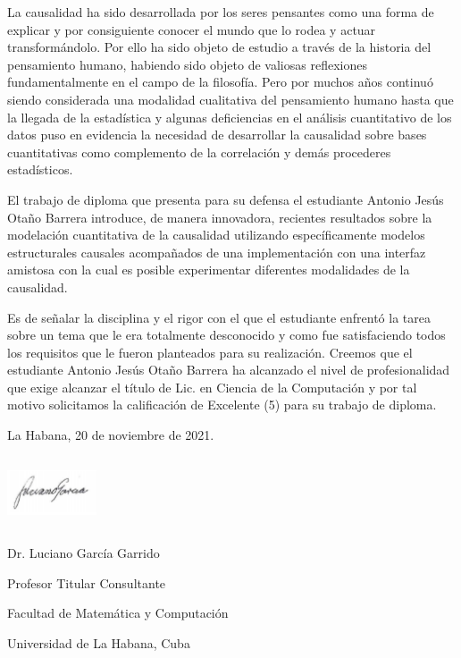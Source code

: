 \begin{opinion}
	La causalidad ha sido desarrollada por los seres pensantes como una forma de explicar y por 
	consiguiente conocer el mundo que lo rodea y actuar transformándolo. Por ello ha sido objeto de estudio a través de la historia del pensamiento humano, habiendo sido objeto de valiosas reflexiones fundamentalmente en el campo de la filosofía. Pero por muchos años continuó siendo	considerada una modalidad cualitativa del pensamiento humano hasta que la llegada de la estadística y algunas deficiencias en el análisis cuantitativo de los datos puso en evidencia la necesidad de desarrollar la causalidad sobre bases cuantitativas como complemento de la correlación y demás procederes estadísticos.
	
	El trabajo de diploma que presenta para su defensa el estudiante Antonio Jesús Otaño Barrera introduce, de manera innovadora, recientes resultados sobre la modelación cuantitativa de la causalidad utilizando específicamente modelos estructurales causales acompañados de una implementación con una interfaz amistosa con la cual es posible experimentar diferentes modalidades de la causalidad.
	 
	Es de señalar la disciplina y el rigor con el que el estudiante enfrentó la tarea sobre un tema que le era totalmente desconocido y como fue satisfaciendo todos los requisitos que le fueron planteados para su realización. Creemos que el estudiante Antonio Jesús Otaño Barrera ha alcanzado el nivel de profesionalidad que exige alcanzar el título de Lic. en Ciencia de la Computación y por tal motivo solicitamos la calificación de Excelente (5) para su trabajo de diploma.
	
	La Habana, 20 de noviembre de 2021.
	
	\includegraphics[width=100px, height=80px]{./images/opinion.png}
	
	Dr. Luciano García Garrido
	
	Profesor Titular Consultante
	
	Facultad de Matemática y Computación	
	
	Universidad de La Habana, Cuba
	
\end{opinion}